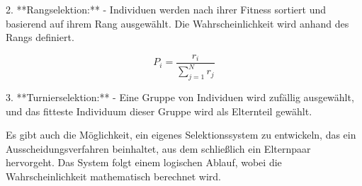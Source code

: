 2. **Rangselektion:**
- Individuen werden nach ihrer Fitness sortiert und basierend 
auf ihrem Rang ausgewählt. Die Wahrscheinlichkeit wird anhand 
des Rangs definiert.

\begin{equation}
    \label{eq:probability_rating}
    P_i = \frac{r_i}{\sum_{j=1}^{N} r_j}
\end{equation}

3. **Turnierselektion:**
- Eine Gruppe von Individuen wird zufällig ausgewählt, und 
das fitteste Individuum dieser Gruppe wird als Elternteil gewählt.

Es gibt auch die Möglichkeit, ein eigenes Selektionssystem zu entwickeln, 
das ein Ausscheidungsverfahren beinhaltet, aus dem schließlich ein 
Elternpaar hervorgeht. Das System folgt einem logischen Ablauf, wobei 
die Wahrscheinlichkeit mathematisch berechnet wird.
